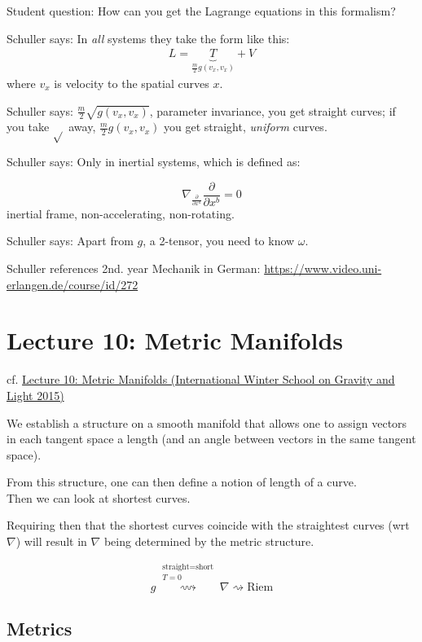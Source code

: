 Student question: How can you get the Lagrange equations in this formalism?

Schuller says: In \emph{all} systems they take the form like this:
\[
\begin{gathered}
L = \underbrace{T}_{\frac{m}{2} g(v_x, v_x)} + V
\end{gathered}
\]
where $v_x$ is velocity to the spatial curves $x$.

Schuller says: $\frac{m}{2} \sqrt{ g(v_x, v_x)}$, parameter invariance, you get straight curves; if you take $\sqrt{}$ away, $\frac{m}{2} g(v_x, v_x)$ you get straight, \emph{uniform} curves. 

Schuller says: Only in inertial systems, which is defined as:

\[
\boxed{ \nabla_{\frac{ \partial }{ \partial x^a} } \frac{\partial }{ \partial x^b} = 0 }
\]
inertial frame, non-accelerating, non-rotating.

Schuller says: Apart from $g$, a 2-tensor, you need to know $\omega$.
	
Schuller references 2nd. year Mechanik in German: \url{https://www.video.uni-erlangen.de/course/id/272}

	
	\section{Lecture 10: Metric Manifolds}
	
	cf. \href{https://youtu.be/ONCZNwKswn4}{Lecture 10: Metric Manifolds (International Winter School on Gravity and Light 2015)}
	
	We establish a structure on a smooth manifold that allows one to assign vectors in each tangent space a length (and an angle between vectors in the same tangent space).
	
	From this structure, one can then define a notion of length of a curve. \\
	Then we can look at shortest curves.
	
	Requiring then that the shortest curves coincide with the straightest curves (wrt $\nabla$) will result in $\nabla$ being determined by the metric structure.  
	
	\[
	g  \overset{ \substack{ \text{straight} = \text{short} \\ T =0 }  }{ \rightsquigarrow }  \nabla \rightsquigarrow \text{Riem}
	\]
	
	
	\subsection{Metrics}
	
